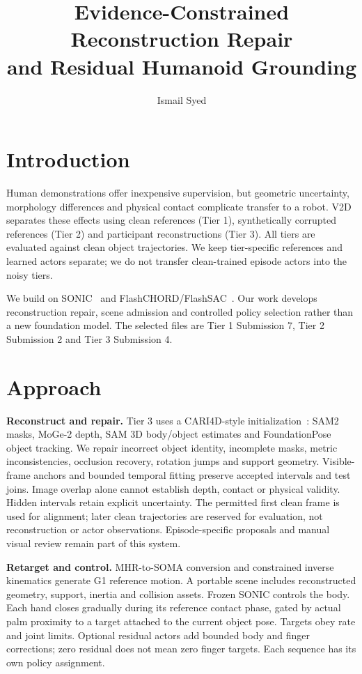 \documentclass[10pt]{nvidiaextabstract}
\title{Evidence-Constrained Reconstruction Repair\\and Residual Humanoid Grounding}
\author[1,2]{Ismail Syed}
\affil[1]{University of Texas at Austin}
\affil[2]{\href{https://www.longhorizon.bot}{www.longhorizon.bot}}
\affil[ ]{\texttt{syedim@gmail.com}}
\begin{document}
\maketitle
\section{Introduction}
Human demonstrations offer inexpensive supervision, but geometric uncertainty,
morphology differences and physical contact complicate transfer to a robot.
V2D~\cite{v2d} separates these effects using clean references (Tier 1), synthetically
corrupted references (Tier 2) and participant reconstructions (Tier 3).
All tiers are evaluated against clean object trajectories. We keep tier-specific
references and learned actors separate; we do not transfer clean-trained
episode actors into the noisy tiers.

We build on SONIC~\cite{sonic} and FlashCHORD/FlashSAC~\cite{flashchord,flashsac}.
Our work develops reconstruction repair, scene admission and controlled policy
selection rather than a new foundation model. The selected files are Tier 1
Submission 7, Tier 2 Submission 2 and Tier 3 Submission 4.

\section{Approach}
\textbf{Reconstruct and repair.}
Tier 3 uses a CARI4D-style initialization~\cite{cari4d}: SAM2 masks,
MoGe-2 depth, SAM 3D body/object estimates and FoundationPose object tracking.
We repair incorrect object identity, incomplete masks, metric inconsistencies,
occlusion recovery, rotation jumps and support geometry. Visible-frame anchors
and bounded temporal fitting preserve accepted intervals and test joins.
Image overlap alone cannot establish depth, contact or physical validity.
Hidden intervals retain explicit uncertainty. The permitted first clean frame
is used for alignment; later clean trajectories are reserved for evaluation,
not reconstruction or actor observations. Episode-specific proposals and manual
visual review remain part of this system.

\textbf{Retarget and control.}
MHR-to-SOMA conversion and constrained inverse kinematics generate G1 reference
motion. A portable scene includes reconstructed geometry, support, inertia and
collision assets. Frozen SONIC controls the body. Each hand closes gradually
during its reference contact phase, gated by actual palm proximity to a target
attached to the current object pose. Targets obey rate and joint limits.
Optional residual actors add bounded body and finger corrections; zero residual
does not mean zero finger targets. Each sequence has its own policy assignment.
\end{document}
